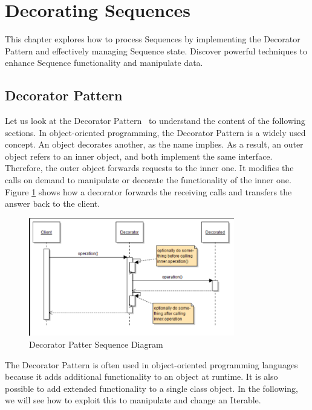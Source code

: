 \section{Decorating Sequences}
\label{sec:Decorating Sequences}
This chapter explores how to process Sequences by implementing the Decorator 
Pattern and effectively managing Sequence state. Discover powerful techniques 
to enhance Sequence functionality and manipulate data.

\subsection{Decorator Pattern}
\label{sub:Decorator Pattern}
Let us look at the Decorator Pattern~\cite{} to understand the content of the 
following sections. In object-oriented programming, the Decorator Pattern is a 
widely used concept. An object decorates another, as the name implies. As a 
result, an outer object refers to an inner object, and both implement the same 
interface. Therefore, the outer object forwards requests to the inner one. It 
modifies the calls on demand to manipulate or decorate the functionality of the 
inner one. Figure \ref{fig:seq_diagramm} shows how a decorator forwards the receiving calls and 
transfers the answer back to the client.

\begin{figure}[H]
    \centering
    \includegraphics[width=0.8\textwidth]{./mainmatter/pictures/decorator_sequence_diagramm.png}
    \caption{Decorator Patter Sequence Diagram}
    \label{fig:seq_diagramm}
\end{figure}

The Decorator Pattern is often used in object-oriented programming languages 
because it adds additional functionality to an object at runtime. It is also 
possible to add extended functionality to a single class object. In the 
following, we will see how to exploit this to manipulate and change an Iterable.

